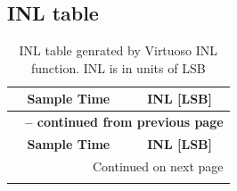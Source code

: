 \documentclass[english, 12pt, a4paper]{ifimaster}
\begin{document}
\begin{appendices}


\chapter{INL table}


\begin{center}
\begin{longtable}[htbp]{|c|c|}
\caption{INL table genrated by Virtuoso INL function. INL is in units of LSB}\label{table:data:inl}\\

\hline 
\multicolumn{1}{|c|}{\textbf{Sample Time}}  &
\multicolumn{1}{c|}{\textbf{INL [LSB]}}  \\
\hline 
\endfirsthead
\multicolumn{2}{c}{{\bfseries \tablename\ \thetable{} -- continued from previous page}} \\
\hline
\multicolumn{1}{|c|}{\textbf{Sample Time}}  &
\multicolumn{1}{c|}{\textbf{INL [LSB]}}  \\
\hline 
\endhead

\hline \multicolumn{2}{|r|}{{Continued on next page}} \\ \hline
\endfoot


\end{longtable}
\end{center}
\end{appendices}
\end{document}
